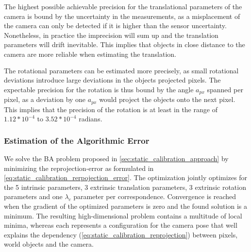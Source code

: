The highest possible achievable precision for the translational parameters of the camera is bound by the uncertainty in the measurements, as a misplacement of the camera can only be detected if it is higher than the sensor uncertainty.
Nonetheless, in practice the imprecision will sum up and the translation parameters will drift inevitable. 
This implies that objects in close distance to the camera are more reliable when estimating the translation.

The rotational parameters can be estimated more precisely, as small rotational deviations introduce large deviations in the objects projected pixels.
The expectable precision for the rotation is thus bound by the angle $a_{px}$ spanned per pixel, as a deviation by one $a_{px}$ would project the objects onto the next pixel.
This implies that the precision of the rotation is at least in the range of $1.12 * 10^{-4}$ to $3.52 * 10^{-4}$ radians. 


\subsubsection{Estimation of the Algorithmic Error}
We solve the BA problem proposed in \autoref{sec:static_calibration_approach} by minimizing the reprojection-error as formulated in \autoref{eq:static_calibration_rerpojection_error}.
The optimization jointly optimizes for the 5 intrinsic parameters, 3 extrinsic translation parameters, 3 extrinsic rotation parameters and one $\lambda_c$ parameter per correspondence.
Convergence is reached when the gradient of the optimized parameters is zero and the found solution is a minimum.
The resulting high-dimensional problem contains a multitude of local minima, whereas each represents a configuration for the camera pose that well explains the dependency (\autoref{eq:static_calibration_reprojection}) between pixels, world objects and the camera. 

